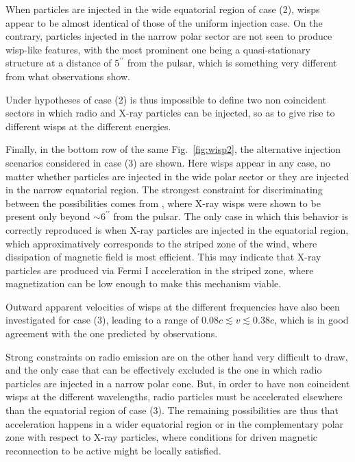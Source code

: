 When particles are injected in the wide equatorial region of case (2), wisps appear to be almost identical of those of the uniform injection case. 
On the contrary, particles injected in the narrow polar sector are not seen to produce wisp-like features, with the most prominent one being a quasi-stationary structure at a distance of $5^{\prime\prime}$ from the pulsar, which is something very different from what observations show.

Under hypotheses of case (2) is thus impossible to define two non coincident sectors in which radio and X-ray particles can be injected, so as to give rise to different wisps at the different energies.

Finally, in the bottom row of the same Fig.~\ref{fig:wisp2}, the alternative injection scenarios considered in case (3) are shown. 
Here wisps appear in any case, no matter whether particles are injected in the wide polar sector or they are injected in the narrow equatorial region. 
The strongest constraint for discriminating between the possibilities comes from \citet{Schweizer:2013}, 
where X-ray wisps were shown to be present only beyond $\sim 6^{\prime\prime}$ from the pulsar. 
The only case in which this behavior is correctly reproduced is when X-ray particles are injected in the equatorial region, which approximatively corresponds to the striped zone of the wind, where dissipation of magnetic field is most efficient.
This may indicate that X-ray particles are produced via Fermi I acceleration in the striped zone, where magnetization can be low enough to make this mechanism viable.

Outward apparent velocities of wisps at the different frequencies have also been investigated for case (3), leading to a range of $0.08c \lesssim v \lesssim 0.38c$, which is in good agreement with the one predicted by observations.

Strong constraints on radio emission are on the other hand very difficult to draw, and the only case that can be effectively excluded is the one in which radio particles are injected in a narrow polar cone. 
But, in order to have non coincident wisps at the different wavelengths, radio particles must be accelerated elsewhere than the equatorial region of case (3). 
The remaining possibilities are thus that acceleration happens in a wider equatorial region or in the complementary polar zone with respect to X-ray particles, where conditions for driven magnetic reconnection to be active might be locally satisfied.
